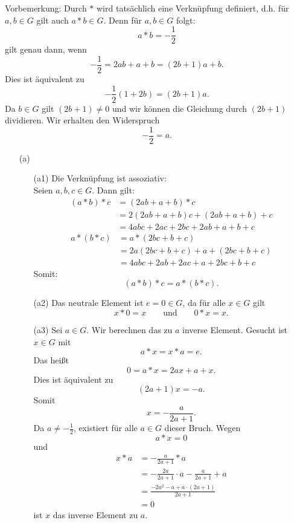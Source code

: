 \documentclass[
				a4paper,
				10pt
			]
			{scrartcl}
\begin{document}
Vorbemerkung:
Durch $\ast$ wird tats\"achlich eine Verkn\"upfung definiert, d.h. f\"ur $a,b \in G$ gilt auch $a\ast b \in G$. Denn f\"ur $a,b\in G$ folgt:
$$
	a\ast b = -\frac{1}{2}
$$ 
gilt genau dann, wenn
$$
	-\frac{1}{2} = 2ab + a +b = (2b+1)a + b.
$$
Dies ist \"aquivalent zu
$$
	-\frac{1}{2}( 1 + 2b ) = (2b+1)a.
$$
Da $b\in G$ gilt $(2b+1)\neq 0$ und wir k\"onnen die Gleichung durch $(2b+1)$ dividieren. Wir erhalten den Widerspruch
$$
	-\frac{1}{2} = a.
$$

\begin{itemize}
	\item[(a)]
		\begin{itemize}
			\item[(a1)] Die Verkn\"upfung ist assoziativ:\\
					Seien $a,b,c \in G$. Dann gilt:
					\begin{align*}
						(a\ast b)\ast c	&=	 (2ab + a + b)\ast c\\
									&=	 2(2ab + a + b)c + (2ab + a + b) + c\\
									&=	 4abc + 2ac + 2bc + 2ab + a+ b + c
					\end{align*}
					\begin{align*}
						a\ast(b\ast c)	&=	 a\ast(2bc + b+ c)	\\
									&=	 2a(2bc + b + c) + a + (2bc + b + c)\\
									&=	 4abc + 2ab + 2ac + a + 2bc + b +c
					\end{align*}
					Somit:
					$$
						(a\ast b)\ast c = a\ast(b\ast c).
					$$
					
			\item[(a2)] Das neutrale Element ist $e = 0 \in G$, da f\"ur alle $x \in G$ gilt
					$$
						x\ast 0 = x	\qquad\text{und}\qquad	0\ast x = x.
					$$		
			\item[(a3)] Sei $a\in G$. Wir berechnen das zu $a$ inverse Element. Gesucht ist $x\in G$ mit
					$$
						a\ast x = x\ast a = e.
					$$
					Das hei{\ss}t
					$$
						0 = a\ast x = 2ax + a + x. 
					$$
					Dies ist \"aquivalent zu
					$$
						(2a+1)x = -a.
					$$
					Somit
					$$
						x = - \frac{a}{2a+1}.
					$$
					Da $a\neq -\frac{1}{2}$, existiert f\"ur alle $a\in G$ dieser Bruch.
					Wegen
					$$
						a\ast x = 0
					$$
					und 
					\begin{align*}
						x \ast a	&=	- \frac{a}{2a+1} \ast a	\\
								&=	 -\frac{2a}{2a+1}\cdot a - \frac{a}{2a+1}  + a \\
								&=	\frac{-2a^2 - a + a\cdot(2a+1)}{2a+1}		\\
								&=	0
					\end{align*}
					ist $x$ das inverse Element zu $a$.\\
					

\end{itemize}
\end{itemize}
\end{document}

